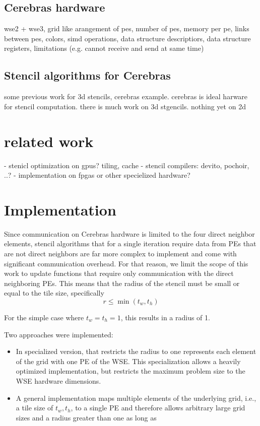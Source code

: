 \documentclass{article}
\begin{document}
\subsection{Cerebras hardware}
wse2 + wse3, grid like arangement of pes, number of pes, memory per pe, links between pes, colors, simd operations, data structure descriptiors, data structure registers, limitations (e.g. cannot receive and send at same time)
\subsection{Stencil algorithms for Cerebras}
some previous work for 3d stencils, cerebras example.
cerebras is ideal harware for stencil computation. 
there is much work on 3d stgencils. nothing yet on 2d
\section{related work}
- stenicl optimization on gpus? tiling, cache
- stencil compilers: devito, pochoir, ..?
- implementation on fpgas or other specielized hardware?



\section{Implementation}
Since communication on Cerebras hardware is limited to the four direct neighbor elements, stencil algorithms that for a single iteration require data from PEs that are not direct neighbors are far more complex to implement and come with significant communication overhead. For that reason, we limit the scope of this work to update functions that require only communication with the direct neighboring PEs. This means that the radius of the stencil must be small or equal to the tile size, specifically
\begin{equation}    
\label{}
r \leq \min(t_w, t_h)
\end{equation}

For the simple case where $t_w=t_h=1$, this results in a radius of 1.

Two approaches were implemented:
\begin{itemize}
    \item In specialized version, that restricts the radius to one represents each element of the grid with one PE of the WSE. This specialization allows a heavily optimized implementation, but restricts the maximum problem size to the WSE hardware dimensions.
    \item A general implementation maps multiple elements of the underlying grid, i.e., a tile size of $t_w, t_h$, to a single PE and therefore allows arbitrary large grid sizes and a radius greater than one as long as 
\end{itemize}
\end{document}
